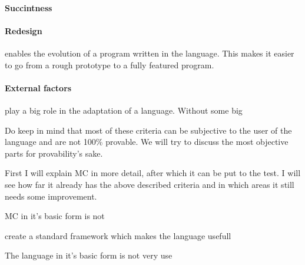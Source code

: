 \paragraph{Succintness}
\paragraph{Redesign}
enables the evolution of a program written in the language. This makes it easier to go from a rough prototype to a fully featured program.
\paragraph{External factors}
play a big role in the adaptation of a language. Without some big 

Do keep in mind that most of these criteria can be subjective to the user of the language and are not 100\% provable. We will try to discuss the most objective parts for provability's sake.

First I will explain MC in more detail, after which it can be put to the test. I will see how far it already has the above described criteria and in which areas it still needs some improvement.

  

MC in it's basic form is not

create a standard framework which makes the language usefull

The language in it's basic form is not very use

